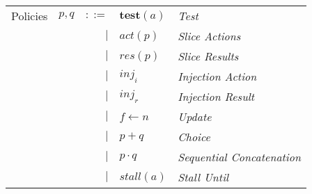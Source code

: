 \documentclass[12pt, letterpaper]{article}
\begin{document}
    \begin{tabular}{l c r l l}
        Policies    & $p,q$ & $::=$  & $\mathbf{test}(a)$ & \textit{Test}     \\
                    &       & $\mid$ & $act(p)$           & \textit{Slice Actions}    \\
                    &       & $\mid$ & $res(p)$           & \textit{Slice Results}    \\
                    &       & $\mid$ & $inj_{i}$          & \textit{Injection Action} \\
                    &       & $\mid$ & $inj_{r}$          & \textit{Injection Result} \\
                    &       & $\mid$ & $f \leftarrow n$   & \textit{Update}   \\
                    &       & $\mid$ & $p + q$            & \textit{Choice}   \\
                    &       & $\mid$ & $p \cdot q$        & \textit{Sequential Concatenation} \\
                    &       & $\mid$ & $stall(a)$         & \textit{Stall Until}
    \end{tabular}\\


\newpage
\end{document}

